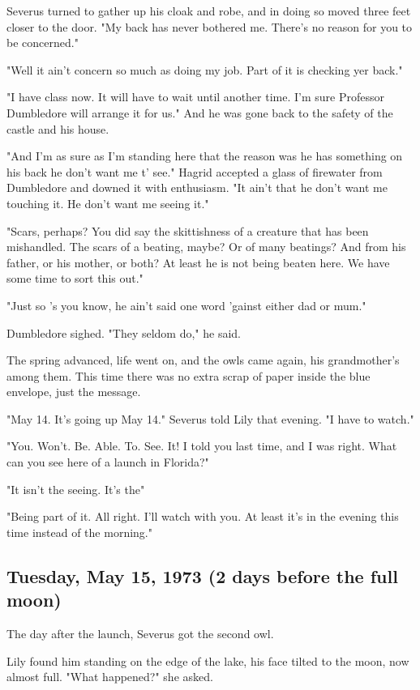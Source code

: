 Severus turned to gather up his cloak and robe, and in doing so moved three feet closer to the door. "My back has never bothered me. There's no reason for you to be concerned."

"Well it ain't concern so much as doing my job. Part of it is checking yer back."

"I have class now. It will have to wait until another time. I'm sure Professor Dumbledore will arrange it for us." And he was gone back to the safety of the castle and his house.

"And I'm as sure as I'm standing here that the reason was he has something on his back he don't want me t' see." Hagrid accepted a glass of firewater from Dumbledore and downed it with enthusiasm. "It ain't that he don't want me touching it. He don't want me seeing it."

"Scars, perhaps? You did say the skittishness of a creature that has been mishandled. The scars of a beating, maybe? Or of many beatings? And from his father, or his mother, or both? At least he is not being beaten here. We have some time to sort this out."

"Just so 's you know, he ain't said one word 'gainst either dad or mum."

Dumbledore sighed. "They seldom do," he said.

The spring advanced, life went on, and the owls came again, his grandmother's among them. This time there was no extra scrap of paper inside the blue envelope, just the message.

"May 14. It's going up May 14." Severus told Lily that evening. "I have to watch."

"You. Won't. Be. Able. To. See. It! I told you last time, and I was right. What can you see here of a launch in Florida?"

"It isn't the seeing. It's the{\el}"

"Being part of it. All right. I'll watch with you. At least it's in the evening this time instead of the morning."

\subsection{Tuesday, May 15, 1973 (2 days before the full moon)}

The day after the launch, Severus got the second owl.

Lily found him standing on the edge of the lake, his face tilted to the moon, now almost full. "What happened?" she asked.


